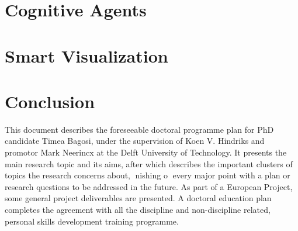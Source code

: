 \chapter{Cognitive Agents}
\chapter{Smart Visualization}
\chapter{Conclusion}
This document describes the foreseeable doctoral programme plan for PhD
candidate Timea Bagosi, under the supervision of Koen V. Hindriks and
promotor Mark Neerincx at the Delft University of Technology. It presents
the main research topic and its aims, after which describes the important
clusters of topics the research concerns about, nishing o every major point
with a plan or research questions to be addressed in the future. As part
of a European Project, some general project deliverables are presented. A
doctoral education plan completes the agreement with all the discipline and
non-discipline related, personal skills development training programme.
    
  